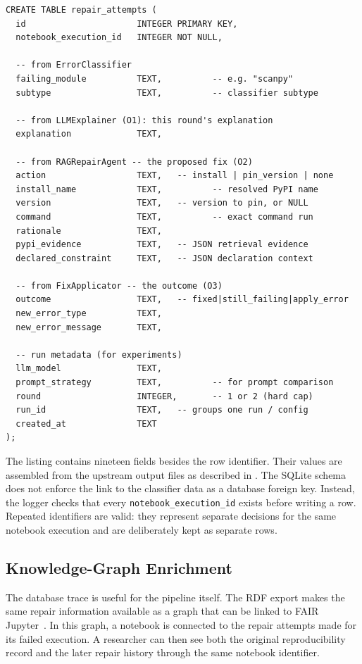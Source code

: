 \begin{verbatim}
CREATE TABLE repair_attempts (
  id                      INTEGER PRIMARY KEY,
  notebook_execution_id   INTEGER NOT NULL,

  -- from ErrorClassifier
  failing_module          TEXT,          -- e.g. "scanpy"
  subtype                 TEXT,          -- classifier subtype

  -- from LLMExplainer (O1): this round's explanation
  explanation             TEXT,

  -- from RAGRepairAgent -- the proposed fix (O2)
  action                  TEXT,   -- install | pin_version | none
  install_name            TEXT,          -- resolved PyPI name
  version                 TEXT,   -- version to pin, or NULL
  command                 TEXT,          -- exact command run
  rationale               TEXT,
  pypi_evidence           TEXT,   -- JSON retrieval evidence
  declared_constraint     TEXT,   -- JSON declaration context

  -- from FixApplicator -- the outcome (O3)
  outcome                 TEXT,   -- fixed|still_failing|apply_error
  new_error_type          TEXT,
  new_error_message       TEXT,

  -- run metadata (for experiments)
  llm_model               TEXT,
  prompt_strategy         TEXT,          -- for prompt comparison
  round                   INTEGER,       -- 1 or 2 (hard cap)
  run_id                  TEXT,   -- groups one run / config
  created_at              TEXT
);
\end{verbatim}

The listing contains nineteen fields besides the row identifier. Their values
are assembled from the upstream output files as described in
. The SQLite schema does not enforce the link to the
classifier data as a database foreign key. Instead, the logger checks that
every \texttt{notebook\_execution\_id} exists before writing a row. Repeated
identifiers are valid: they represent separate decisions for the same
notebook execution and are deliberately kept as separate rows.

\subsection{Knowledge-Graph Enrichment}
\label{subsec:kg}

The database trace is useful for the pipeline itself. The RDF export makes
the same repair information available as a graph that can be linked to FAIR
Jupyter~\cite{samuel2024fairkg}. In this graph, a notebook is connected to
the repair attempts made for its failed execution. A researcher can then see
both the original reproducibility record and the later repair history through
the same notebook identifier.

